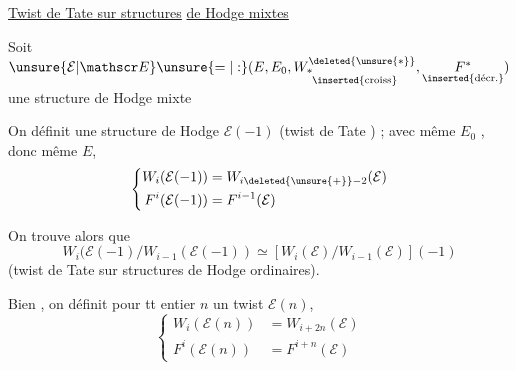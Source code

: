 \uline{Twist de Tate sur structures} \uline{de Hodge mixtes}

Soit $\unsure{\mathcal E|\mathscr E}\unsure{=|:}(E,E_0,\underset{\inserted{\text{croiss}}}{W_*^{\deleted{\unsure{*}}}},\underset{\inserted{\text{décr.}}}{F^*})$ une structure de Hodge mixte

On définit une structure de Hodge $\mathcal E(-1)$  (twist de Tate ) ;  avec même $E_0$ , donc même $E$,
\[
\left\{\begin{aligned}
W_i(\mathcal E(-1))&=W_{i\deleted{\unsure{+}}-2}(\mathcal E)\\
F^i(\mathcal E(-1))&=F^{i-1}(\mathcal E)
\end{aligned}\right.
\]

On trouve alors que
\[
 W_i(\mathcal E(-1)/W_{i-1}(\mathcal E(-1))\simeq
 [W_i(\mathcal E)/W_{i-1}(\mathcal E)](-1)
\]
(twist de Tate sur structures de Hodge ordinaires).

Bien , on définit pour tt entier $n$ un twist $\mathcal E(n)$,
\[
\left\{\begin{aligned}
W_i(\mathcal E(n))&=W_{i+2n}(\mathcal E)\\
F^i(\mathcal E(n))&=F^{i+n}(\mathcal E)
\end{aligned}\right.
\]
